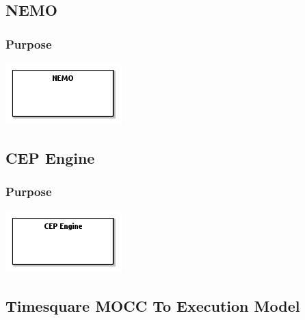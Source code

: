 \documentclass{gemoc} %
\begin{document}
\subsection{NEMO}


\subsubsection{Purpose}

\begin{center}
\includegraphics*[trim=0.0cm 0.0cm 0cm 0.0cm, clip=true]{../images/generated/Generated_NEMO.png}
\end{center}



\subsection{CEP Engine}


\subsubsection{Purpose}

\begin{center}
\includegraphics*[trim=0.0cm 0.0cm 0cm 0.0cm, clip=true]{../images/generated/Generated_CEP_Engine.png}
\end{center}



\subsection{Timesquare MOCC To Execution Model}
\end{document}

